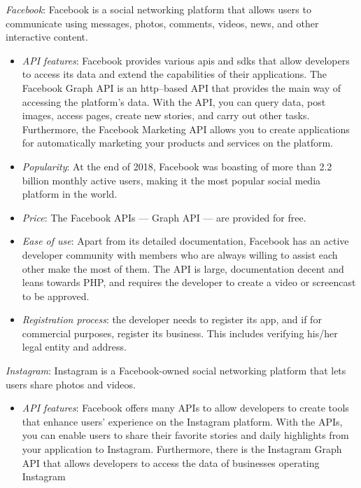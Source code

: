 \begin{enum-c}
\item \emph{Facebook}:
  Facebook is a social networking platform that allows users to communicate
  using messages, photos, comments, videos, news, and other interactive content.
  \begin{itemize}
  \item \emph{API features}:
    Facebook provides various \glspl{api} and \glspl{sdk} that allow developers to access its
    data and extend the capabilities of their applications. The Facebook Graph
    API is an \gls{http}--based API that provides the main way of accessing the
    platform's data. With the API, you can query data, post images, access
    pages, create new stories, and carry out other tasks. Furthermore, the
    Facebook Marketing API allows you to create applications for automatically
    marketing your products and services on the platform.
  \item \emph{Popularity}:
    At the end of 2018, Facebook was boasting of more than 2.2
    billion monthly active users, making it the most popular social media
    platform in the world.
  \item \emph{Price}:
    The Facebook APIs --- Graph API --- are provided for free.
  \item \emph{Ease of use}:
    Apart from its detailed documentation, Facebook has an active
developer community with members who are always willing to assist each other
make the most of them. The API is large, documentation decent and leans towards
PHP, and requires the developer to create a video or screencast to be approved.
\item \emph{Registration process}: the developer needs to register its app, and if for
  commercial purposes, register its business. This includes verifying his/her legal entity and address.
  \end{itemize}
%
\item \emph{Instagram}:
Instagram is a Facebook-owned social networking platform that lets users share
photos and videos.
%
\begin{itemize}
\item \emph{API features}:
  Facebook offers many APIs to allow developers to create tools that enhance
  users' experience on the Instagram platform. With the APIs, you can enable
  users to share their favorite stories and daily highlights from your
  application to Instagram. Furthermore, there is the Instagram Graph API that
  allows developers to access the data of businesses operating Instagram

\end{itemize}
\end{enum-c}
